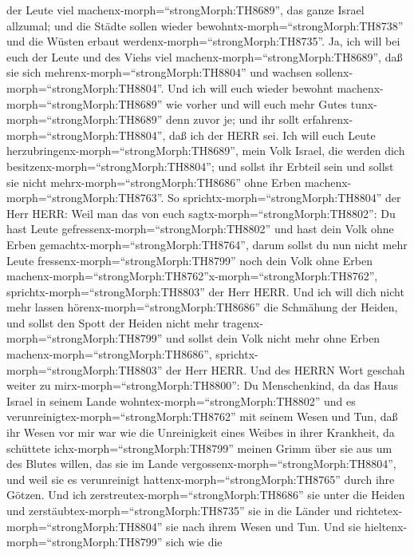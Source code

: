 der Leute viel machenx-morph=``strongMorph:TH8689'', das ganze Israel
allzumal; und die Städte sollen wieder
bewohntx-morph=``strongMorph:TH8738'' und die Wüsten erbaut
werdenx-morph=``strongMorph:TH8735''.  Ja, ich will bei
euch der Leute und des Viehs viel machenx-morph=``strongMorph:TH8689'',
daß sie sich mehrenx-morph=``strongMorph:TH8804'' und wachsen
sollenx-morph=``strongMorph:TH8804''. Und ich will euch wieder bewohnt
machenx-morph=``strongMorph:TH8689'' wie vorher und will euch mehr Gutes
tunx-morph=``strongMorph:TH8689'' denn zuvor je; und ihr sollt
erfahrenx-morph=``strongMorph:TH8804'', daß ich der HERR sei.
 Ich will euch Leute
herzubringenx-morph=``strongMorph:TH8689'', mein Volk Israel, die werden
dich besitzenx-morph=``strongMorph:TH8804''; und sollst ihr Erbteil sein
und sollst sie nicht mehrx-morph=``strongMorph:TH8686'' ohne Erben
machenx-morph=``strongMorph:TH8763''.  So
sprichtx-morph=``strongMorph:TH8804'' der Herr HERR: Weil man das von
euch sagtx-morph=``strongMorph:TH8802'': Du hast Leute
gefressenx-morph=``strongMorph:TH8802'' und hast dein Volk ohne Erben
gemachtx-morph=``strongMorph:TH8764'',  darum sollst du nun
nicht mehr Leute fressenx-morph=``strongMorph:TH8799'' noch dein Volk
ohne Erben
machenx-morph=``strongMorph:TH8762''x-morph=``strongMorph:TH8762'',
sprichtx-morph=``strongMorph:TH8803'' der Herr HERR.  Und
ich will dich nicht mehr lassen hörenx-morph=``strongMorph:TH8686'' die
Schmähung der Heiden, und sollst den Spott der Heiden nicht mehr
tragenx-morph=``strongMorph:TH8799'' und sollst dein Volk nicht mehr
ohne Erben machenx-morph=``strongMorph:TH8686'',
sprichtx-morph=``strongMorph:TH8803'' der Herr HERR.  Und
des HERRN Wort geschah weiter zu mirx-morph=``strongMorph:TH8800'':
 Du Menschenkind, da das Haus Israel in seinem Lande
wohntex-morph=``strongMorph:TH8802'' und es
verunreinigtex-morph=``strongMorph:TH8762'' mit seinem Wesen und Tun,
daß ihr Wesen vor mir war wie die Unreinigkeit eines Weibes in ihrer
Krankheit,  da schüttete ichx-morph=``strongMorph:TH8799''
meinen Grimm über sie aus um des Blutes willen, das sie im Lande
vergossenx-morph=``strongMorph:TH8804'', und weil sie es verunreinigt
hattenx-morph=``strongMorph:TH8765'' durch ihre Götzen. 
Und ich zerstreutex-morph=``strongMorph:TH8686'' sie unter die Heiden
und zerstäubtex-morph=``strongMorph:TH8735'' sie in die Länder und
richtetex-morph=``strongMorph:TH8804'' sie nach ihrem Wesen und Tun.
 Und sie hieltenx-morph=``strongMorph:TH8799'' sich wie die
